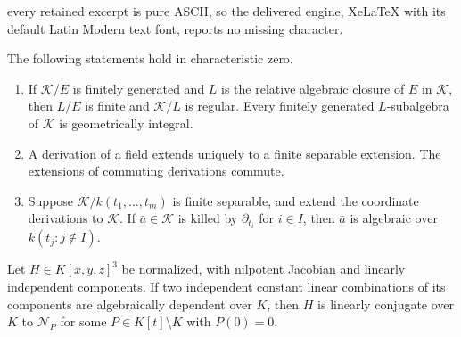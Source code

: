 \documentclass[10pt,a4paper]{amsart}
\newcommand{\Ncal}{\mathcal N}
\begin{document}
every retained excerpt is pure ASCII, so the delivered engine, XeLaTeX with its default Latin Modern text font, reports no missing character.
\begin{lemma}\label{lem:field-facts}
The following statements hold in characteristic zero.
\begin{enumerate}
\item If $\mathcal K/E$ is finitely generated and $L$ is the relative algebraic closure of $E$ in $\mathcal K$, then $L/E$ is finite and $\mathcal K/L$ is regular. Every finitely generated $L$-subalgebra of $\mathcal K$ is geometrically integral.
\item A derivation of a field extends uniquely to a finite separable extension. The extensions of commuting derivations commute.
\item Suppose $\mathcal K/k(t_1,\ldots,t_m)$ is finite separable, and extend the coordinate derivations to $\mathcal K$. If $\bar{a}\in \mathcal K$ is killed by $\partial_{t_i}$ for $i\in I$, then $\bar{a}$ is algebraic over $k(t_j:j\notin I)$.
\end{enumerate}
\end{lemma}

\begin{proposition}\label{prop:pair-normal}
Let $H\in K[x,y,z]^3$ be normalized, with nilpotent Jacobian and linearly independent components. If two independent constant linear combinations of its components are algebraically dependent over $K$, then $H$ is linearly conjugate over $K$ to $\Ncal_P$ for some $P\in K[t]\setminus K$ with $P(0)=0$.
\end{proposition}
\end{document}
